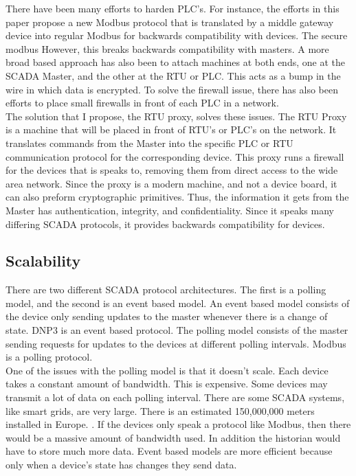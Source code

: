 \documentclass[11pt,a4paper,oldfontcommands]{memoir}
\begin{document}
There have been many efforts to harden PLC's. For instance,  the efforts in this
paper \cite{Secure Modbus} propose a new Modbus protocol that is translated
by a middle gateway device into regular Modbus for backwards compatibility 
with devices. The secure modbus However, this breaks backwards compatibility with masters. A more broad based
 approach has also been to attach  machines at
both ends, one at the SCADA Master, and the other at the RTU or PLC.
\cite{Security Issues in SCADA Networks} This acts as a bump in the wire
in which data is encrypted. To solve the firewall issue, there
has also been efforts to place small firewalls in front of each PLC in a network.
\cite{Security Issues in SCADA Networks} \\

The solution that I propose, the RTU proxy, solves these issues. The RTU Proxy is a 
machine that will be placed in front of RTU's or PLC's on the network. It
translates commands from the Master into the specific PLC or RTU communication 
protocol for the corresponding device. This proxy runs a firewall for the devices
that is speaks to, removing them from direct access to the wide area network. Since
the proxy is a modern machine, and not a device board, it can also preform cryptographic
primitives. Thus, the information it gets from the Master has authentication, integrity,
and confidentiality. Since it speaks many differing SCADA protocols, it provides
backwards compatibility for devices.


\subsection{Scalability}

\indent \indent
There are two different SCADA protocol architectures. The first is a polling model, and
the second is an event based model. An event based model consists of the device only
sending updates to the master whenever there is a change of state. DNP3 is an
event based protocol. The polling
model consists of the master sending requests for updates to the devices
at different polling intervals. Modbus is a polling protocol.\\

\indent
One of the issues with the polling model is that it doesn't scale. Each device
takes a constant amount of bandwidth. This is expensive. Some devices may transmit
a lot of data on each polling interval. There are some SCADA systems, like smart
grids, are very large. There is an estimated 150,000,000 meters installed in Europe.
\cite{Event-based hybrid metering feeding AMI and SCADA}. If the devices only
speak a protocol like Modbus, then there would be a massive amount of bandwidth
used. In addition the historian would have to store much more data. Event based
models are more efficient because only when a device's state has changes they send data.\\
\end{document}
